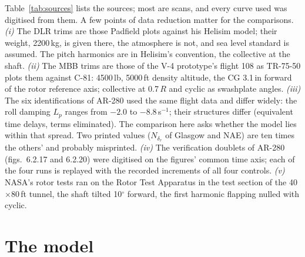 \documentclass[10pt,a4paper,twocolumn]{article}
\begin{document}
Table~\ref{tab:sources} lists the sources; most are scans, and every curve used was digitised from them. A few points of
data reduction matter for the comparisons.
\emph{(i)} The DLR trims are those Padfield plots against his Helisim model; their weight, 2200\,kg, is given there, the
atmosphere is not, and sea level standard is assumed. The pitch harmonics are in Helisim's convention, the collective at the
shaft.
\emph{(ii)} The MBB trims are those of the V-4 prototype's flight 108 as TR-75-50 plots them against C-81: 4500\,lb, 5000\,ft
density altitude, the CG 3.1\,in forward of the rotor reference axis; collective at 0.7\,$R$ and cyclic as swashplate angles.
\emph{(iii)} The six identifications of AR-280 used the same flight data and differ widely: the roll damping $L_p$ ranges from
$-2.0$ to $-8.8$\,s$^{-1}$; their structures differ (equivalent time delays, terms eliminated). The comparison here asks whether the model
lies within that spread. Two printed values ($N_{\delta_r}$ of Glasgow and NAE) are ten times the
others' and probably misprinted.
\emph{(iv)} The verification doublets of AR-280 (figs.~6.2.17 and 6.2.20) were digitised on the figures' common time axis; each of the
four runs is replayed with the recorded increments of all four controls.
\emph{(v)} NASA's rotor tests ran on the Rotor Test Apparatus in the test section of the 40$\times$80\,ft tunnel, the shaft tilted 10$^\circ$
forward, the first harmonic flapping nulled with cyclic.

\section{The model}\label{sec:model}
\end{document}
